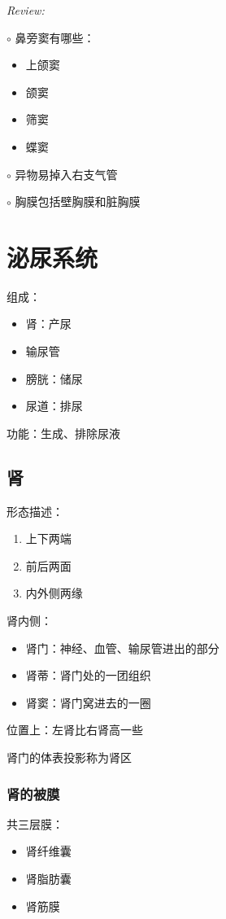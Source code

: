 \textit{Review:}

$\circ$ 鼻旁窦有哪些：
\begin{itemize}
    \item 上颌窦
    \item 颌窦
    \item 筛窦
    \item 蝶窦
\end{itemize}
$\circ$ 异物易掉入右支气管

$\circ$ 胸膜包括壁胸膜和脏胸膜
\section{泌尿系统}%
\label{sec:泌尿系统}
组成：
\begin{itemize}
    \item 肾：产尿
    \item 输尿管
    \item 膀胱：储尿
    \item 尿道：排尿
\end{itemize}
功能：生成、排除尿液
\subsection{肾}%
\label{sub:肾}
形态描述：
\begin{enumerate}
    \item 上下两端
    \item 前后两面
    \item 内外侧两缘
\end{enumerate}
\begin{notation}
    肾内侧：
    \begin{itemize}
        \item 肾门：神经、血管、输尿管进出的部分
        \item 肾蒂：肾门处的一团组织
        \item 肾窦：肾门窝进去的一圈
    \end{itemize}
\end{notation}
位置上：左肾比右肾高一些
\begin{notation}
    肾门的体表投影称为肾区
\end{notation}
\subsubsection*{肾的被膜}%
\label{subsub:肾的被膜}
共三层膜：
\begin{itemize}
    \item 肾纤维囊
    \item 肾脂肪囊
    \item 肾筋膜
\end{itemize}

